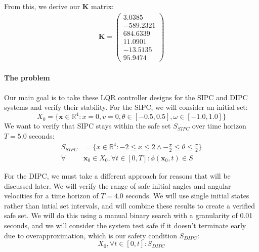 \documentclass{article}
\theoremstyle{plain}
\theoremstyle{definition}
\theoremstyle{remark}
\begin{document}
From this, we derive our \textbf{K} matrix:
\begin{gather*}
    \textbf{K} = \begin{pmatrix}
        3.0385 \\
        -589.2321 \\
        684.6339 \\
        11.0901 \\
        -13.5135 \\
        95.9474
    \end{pmatrix}
\end{gather*}

\paragraph{The problem} 
Our main goal is to take these LQR controller designs for the SIPC and DIPC systems and verify their stability. For the SIPC, we will consider an initial set:
\begin{equation}
    \label{SIPC_init}
    X_0 = \{\textbf{x}\in\mathbb{R}^4:x=0, v=0, \theta\in[-0.5, 0.5], \omega\in[-1.0, 1.0]\}
\end{equation}
We want to verify that SIPC stays within the safe set $S_{SIPC}$ over time horizon $T=5.0$ seconds:
\begin{equation}
    \label{SIPC_safe}
    \begin{aligned}
        S_{SIPC}& = \{x\in\mathbb{R}^4:-2\le x\le 2 \wedge -\frac{\pi}{2} \le \theta \le \frac{\pi}{2}\} \\
        \forall&\textbf{x}_0\in X_0, \forall t\in[0, T]: \phi(\textbf{x}_0, t)\in S
    \end{aligned}
\end{equation}

For the DIPC, we must take a different approach for reasons that will be discussed later. We will verify the range of safe initial angles and angular velocities for a time horizon of $T=4.0$ seconds. We will use single initial states rather than intial set intervals, and will combine these results to create a verified safe set. We will do this using a manual binary search with a granularity of 0.01 seconds, and we will consider the system test safe if it doesn't terminate early due to overapproximation, which is our safety condition $S_{DIPC}$:
\begin{equation}
    \label{DIPC_safe}
    X_0, \forall t\in[0, t]: S_{DIPC}
\end{equation}
\end{document}

